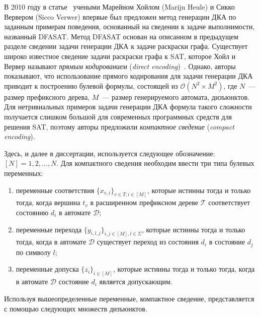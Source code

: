 В 2010 году в статье~\cite{heule-icgi10} учеными Марейном Хойлом (Marijn Heule) и Сикко Вервером (Sicco Verwer) впервые был предложен метод генерации ДКА по заданным примерам поведения, основанный на сведении к задаче выполнимости, названный DFASAT.
Метод DFASAT основан на описанном в предыдущем разделе сведении задачи генерации ДКА к задаче раскраски графа.
Существует широко известное сведение задачи раскраски графа к SAT, которое Хойл и Вервер называют \emph{прямым кодированием} (\emph{direct encoding})~\cite{DBLP:conf/cp/Walsh00}.
Однако, авторы показывают, что использование прямого кодирования для задачи генерации ДКА приводит к построению булевой формулы, состоящей из $\mathcal{O}\left(N^{2} \times M^{2}\right)$, где $N$~--- размер префиксного дерева, $M$~--- размер генерируемого автомата, дизъюнктов.
Для нетривиальных примеров задачи генерации ДКА формула такого сложности получается слишком большой для современных программных средств для решения SAT, поэтому авторы предложили \emph{компактное сведение} (\emph{compact encoding}).

Здесь, и далее в диссертации, используется следующее обозначение: $\left[N\right] = {1,2,\ldots,N}$.
Для компактного сведения необходим ввести три типа булевых переменных:
\begin{enumerate}
  \item переменные соответствия $\{x_{v,i}\}_{v \in T, i \in \left[M\right]}$, которые истинны тогда и только тогда, когда вершина $t_{v}$ в расширенном префиксном дереве $\mathcal{T}$ соответствует состоянию $d_{i}$ в автомате $\mathcal{D}$;
  \item переменные перехода $\{y_{i,l,j}\}_{i,j \in \left[M\right],l \in \Sigma}$, которые истинны тогда и только тогда, когда в автомате $\mathcal{D}$ существует переход из состояния $d_{i}$ в состояние $d_{j}$ по символу $l$;
  \item переменные допуска $\{z_{i}\}_{i \in \left[M\right]}$, которые истинны тогда и только тогда, когда в автомате $\mathcal{D}$ состояние $d_{i}$ является допускающим.
\end{enumerate}

Используя вышеопределенные переменные, компактное сведение, представляется с помощью следующих множеств дизъюнктов.


